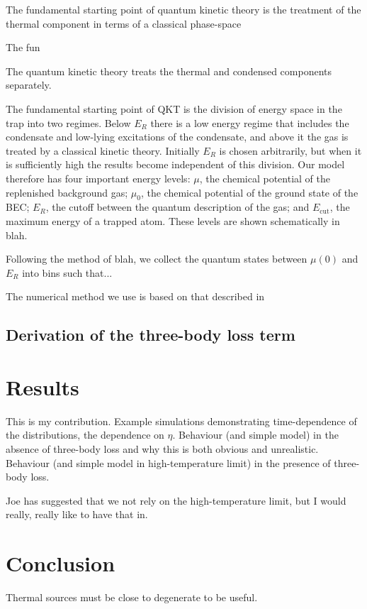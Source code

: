 The fundamental starting point of quantum kinetic theory is the treatment of the thermal component in terms of a classical phase-space 

The fun

The quantum kinetic theory treats the thermal and condensed components separately. 


The fundamental starting point of QKT is the division of energy space in the trap into two regimes. Below $E_R$ there is a low energy regime that includes the condensate and low-lying excitations of the condensate, and above it the gas is treated by a classical kinetic theory. Initially $E_R$ is chosen arbitrarily, but when it is sufficiently high the results become independent of this division. Our model therefore has four important energy levels: $\mu$, the chemical potential of the replenished background gas; $\mu_0$, the chemical potential of the ground state of the BEC; $E_R$, the cutoff between the quantum description of the gas; and $E_\text{cut}$, the maximum energy of a trapped atom. These levels are shown schematically in blah.

Following the method of blah, we collect the quantum states between $\mu(0)$ and $E_R$ into bins such that...

The numerical method we use is based on that described in \citep{Bijlsma:2000}


\subsection{Derivation of the three-body loss term}
\label{KineticTheory:3BodyLoss}

\section{Results}
\label{KineticTheory:Results}
This is my contribution. Example simulations demonstrating time-dependence of the distributions, the dependence on $\eta$. Behaviour (and simple model) in the absence of three-body loss and why this is both obvious and unrealistic. Behaviour (and simple model in high-temperature limit) in the presence of three-body loss.

Joe has suggested that we not rely on the high-temperature limit, but I would really, really like to have that in.

\section{Conclusion}
Thermal sources must be close to degenerate to be useful. 